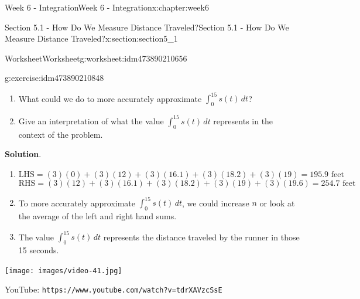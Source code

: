 \documentclass[oneside,10pt,]{book}
\newcommand{\blocktitlefont}{\relax}
\newcommand{\mono}[1]{\texttt{#1}}
\numberwithin{equation}{section}
\newlength{\qrsize}
\newlength{\previewwidth}
\begin{document}
\begin{chapterptx}{Week 6 - Integration}{}{Week 6 - Integration}{}{}{x:chapter:week6}
\begin{sectionptx}{Section 5.1 - How Do We Measure Distance Traveled?}{}{Section 5.1 - How Do We Measure Distance Traveled?}{}{}{x:section:section5_1}
\begin{worksheet-subsection}{Worksheet}{}{Worksheet}{}{}{g:worksheet:idm473890210656}
\begin{divisionexercise}{1}{}{}{g:exercise:idm473890210848}
\begin{enumerate}[label=(\alph*)]
\item{}What could we do to more accurately approximate \(\displaystyle{\int_0^{15} s(t) \, dt}\)?%
\item{}Give an interpretation of what the value \(\displaystyle{\int_0^{15} s(t) \, dt}\) represents in the context of the problem.%
\end{enumerate}
\textbf{\blocktitlefont Solution}.\hypertarget{g:solution:idm473890210192}{}\quad{}%
\begin{enumerate}[label=(\alph*)]
\item{}%
\begin{equation*}
\text{LHS} = (3)(0)+(3)(12)+(3)(16.1)+(3)(18.2)+(3)(19) = 195.9\text{ feet}
\end{equation*}
%
\begin{equation*}
\text{RHS} = (3)(12)+(3)(16.1)+(3)(18.2)+(3)(19)+(3)(19.6) = 254.7\text{ feet}
\end{equation*}
%
\item{}To more accurately approximate \(\displaystyle{\int_0^{15} s(t) \, dt}\), we could increase \(n\) or look at the average of the left and right hand sums.%
\item{}The value \(\displaystyle{\int_0^{15} s(t) \, dt}\) represents the distance traveled by the runner in those 15 seconds.%
\end{enumerate}
\end{divisionexercise}%
\end{worksheet-subsection}
\restoregeometry
\setlength{\qrsize}{9em}
\setlength{\previewwidth}{\linewidth}
\addtolength{\previewwidth}{-\qrsize}
\begin{tcbraster}[raster columns=2, raster column skip=1pt, raster halign=center, raster force size=false, raster left skip=0pt, raster right skip=0pt]%
\begin{tcolorbox}[previewstyle, width=\previewwidth]%
\texttt{[image: images/video-41.jpg]}%
\end{tcolorbox}%
\begin{tcolorbox}[qrstyle]%
{\hypersetup{urlcolor=black}}%
\end{tcolorbox}%
\begin{tcolorbox}[captionstyle]%
\small YouTube: \mono{https://www.youtube.com/watch?v=tdrXAVzcSsE}\end{tcolorbox}%
\end{tcbraster}%
\end{sectionptx}
%
%
\typeout{************************************************}

\end{chapterptx}
\end{document}
